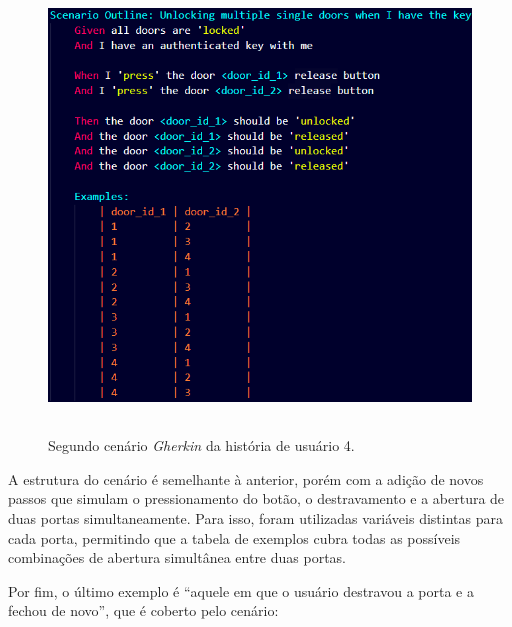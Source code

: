 
\begin{figure}[H]
\centering
\includegraphics[height=12cm]{figuras/cenarios/h4c2.png}
\caption{Segundo cenário \textit{Gherkin} da história de usuário 4.}
\label{fig:h4c2}
\end{figure}

A estrutura do cenário é semelhante à anterior, porém com a adição de novos passos que simulam o pressionamento do botão, o destravamento e a abertura de duas 
portas simultaneamente. Para isso, foram utilizadas variáveis distintas para cada porta, permitindo que a tabela de exemplos cubra todas as possíveis combinações 
de abertura simultânea entre duas portas.

Por fim, o último exemplo é ``aquele em que o usuário destravou a porta e a fechou de novo'', que é coberto pelo cenário:


